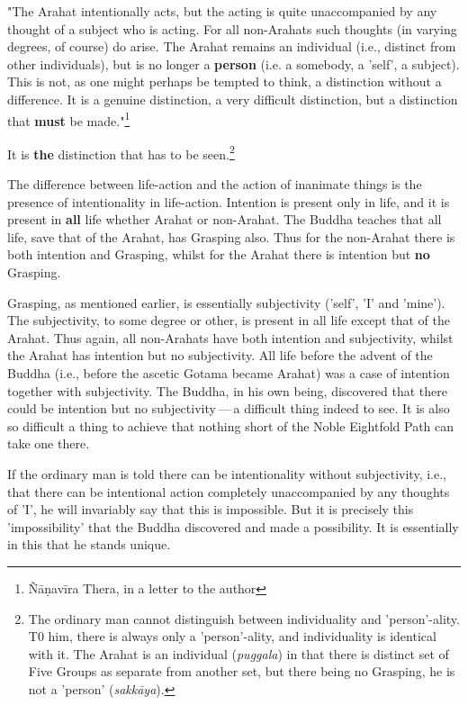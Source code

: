 "The Arahat intentionally acts, but the acting is quite unaccompanied by any thought of a subject who is acting. For all non-Arahats such thoughts (in varying degrees, of course) do arise. The Arahat remains an individual (i.e., distinct from other individuals), but is no longer a \textbf{person} (i.e. a somebody, a 'self', a subject). This is not, as one might perhaps be tempted to think, a distinction without a difference. It is a genuine distinction, a very difficult distinction, but a distinction that \textbf{must} be made."\footnote{Ñāṇavīra Thera, in a letter to the author}

It is \textbf{the} distinction that has to be seen.\footnote{The ordinary man cannot distinguish between individuality and 'person'-ality. T0 him, there is always only a 'person'-ality, and individuality is identical with it. The Arahat is an individual (\emph{puggala}) in that there is distinct set of Five Groups as separate from another set, but there being no Grasping, he is not a 'person' (\emph{sakkāya}).}

The difference between life-action and the action of inanimate things is the presence of intentionality in life-action. Intention is present only in life, and it is present in \textbf{all} life whether Arahat or non-Arahat. The Buddha teaches that all life, save that of the Arahat, has Grasping also. Thus for the non-Arahat there is both intention and Grasping, whilst for the Arahat there is intention but \textbf{no} Grasping.

Grasping, as mentioned earlier, is essentially subjectivity ('self', 'I' and 'mine'). The subjectivity, to some degree or other, is present in all life except that of the Arahat. Thus again, all non-Arahats have both intention and subjectivity, whilst the Arahat has intention but no subjectivity. All life before the advent of the Buddha (i.e., before the ascetic Gotama became Arahat) was a case of intention together with subjectivity. The Buddha, in his own being, discovered that there could be intention but no subjectivity --- a difficult thing indeed to see. It is also so difficult a thing to achieve that nothing short of the Noble Eightfold Path can take one there.

If the ordinary man is told there can be intentionality without subjectivity, i.e., that there can be intentional action completely unaccompanied by any thoughts of 'I', he will invariably say that this is impossible. But it is precisely this 'impossibility' that the Buddha discovered and made a possibility. It is essentially in this that he stands unique.

